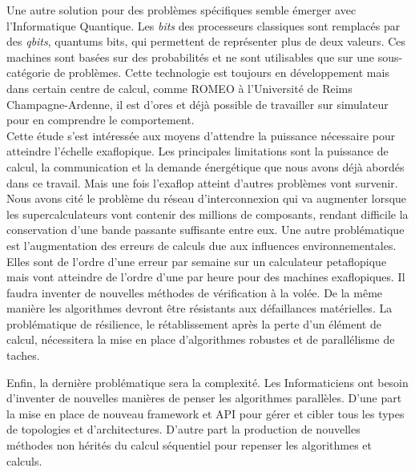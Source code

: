 \documentclass[12pt,a4paper]{report}
\begin{document}
Une autre solution pour des problèmes spécifiques semble émerger avec l'Informatique Quantique. 
Les \textit{bits} des processeurs classiques sont remplacés par des \textit{qbits}, quantums bits, qui permettent de représenter plus de deux valeurs.  
Ces machines sont basées sur des probabilités et ne sont utilisables que sur une sous-catégorie de problèmes. 
Cette technologie est toujours en développement mais dans certain centre de calcul, comme ROMEO à l'Université de Reims Champagne-Ardenne, il est d’ores et déjà possible de travailler sur simulateur pour en comprendre le comportement.\\

Cette étude s'est intéressée aux moyens d'attendre la puissance nécessaire pour atteindre l'échelle exaflopique.
Les principales limitations sont la puissance de calcul, la communication et la demande énergétique que nous avons déjà abordés dans ce travail. 
Mais une fois l'exaflop atteint d'autres problèmes vont survenir. 
Nous avons cité le problème du réseau d'interconnexion qui va augmenter lorsque les supercalculateurs vont contenir des millions de composants, rendant difficile la conservation d'une bande passante suffisante entre eux.
Une autre problématique est l'augmentation des erreurs de calculs due aux influences environnementales. 
Elles sont de l'ordre d'une erreur par semaine sur un calculateur petaflopique mais vont atteindre de l'ordre d'une par heure pour des machines exaflopiques. 
Il faudra inventer de nouvelles méthodes de vérification à la volée. 
De la même manière les algorithmes devront être résistants aux défaillances matérielles. 
La problématique de résilience, le rétablissement après la perte d'un élément de calcul, nécessitera la mise en place d'algorithmes robustes et de parallélisme de taches. 

Enfin, la dernière problématique sera la complexité. 
Les Informaticiens ont besoin d'inventer de nouvelles manières de penser les algorithmes parallèles. 
D'une part la mise en place de nouveau framework et API pour gérer et cibler tous les types de topologies et d'architectures.
D'autre part la production de nouvelles méthodes non hérités du calcul séquentiel pour repenser les algorithmes et calculs. 


\renewcommand\bibname{Bibliographie}


\end{document}
